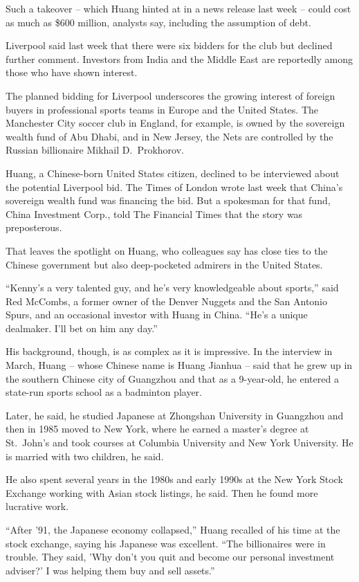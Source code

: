 ﻿\documentclass[12pt]{article}
\begin{document}
Such a takeover -- which Huang hinted at in a news release last week -- could cost as much as \$600
million, analysts say, including the assumption of debt.

Liverpool said last week that there were six bidders for the club but declined further comment.
Investors from India and the Middle East are reportedly among those who have shown interest.

The planned bidding for Liverpool underscores the growing interest of foreign buyers in professional
sports teams in Europe and the United States. The Manchester City soccer club in England, for
example, is owned by the sovereign wealth fund of Abu Dhabi, and in New Jersey, the Nets are
controlled by the Russian billionaire Mikhail D.~Prokhorov.

Huang, a Chinese-born United States citizen, declined to be interviewed about the potential
Liverpool bid. The Times of London wrote last week that China's sovereign wealth fund was financing
the bid. But a spokesman for that fund, China Investment Corp., told The Financial Times that the
story was preposterous.

That leaves the spotlight on Huang, who colleagues say has close ties to the Chinese government but
also deep-pocketed admirers in the United States.

``Kenny's a very talented guy, and he's very knowledgeable about sports,'' said Red McCombs, a
former owner of the Denver Nuggets and the San Antonio Spurs, and an occasional investor with Huang
in China. ``He's a unique dealmaker. I'll bet on him any day.''

His background, though, is as complex as it is impressive. In the interview in March, Huang -- whose
Chinese name is Huang Jianhua -- said that he grew up in the southern Chinese city of Guangzhou and
that as a 9-year-old, he entered a state-run sports school as a badminton player.

Later, he said, he studied Japanese at Zhongshan University in Guangzhou and then in 1985 moved to
New York, where he earned a master's degree at St.~John's and took courses at Columbia University
and New York University. He is married with two children, he said.

He also spent several years in the 1980s and early 1990s at the New York Stock Exchange working with
Asian stock listings, he said. Then he found more lucrative work.

``After '91, the Japanese economy collapsed,'' Huang recalled of his time at the stock exchange,
saying his Japanese was excellent. ``The billionaires were in trouble. They said, 'Why don't you
quit and become our personal investment adviser?' I was helping them buy and sell assets.''
\end{document}
